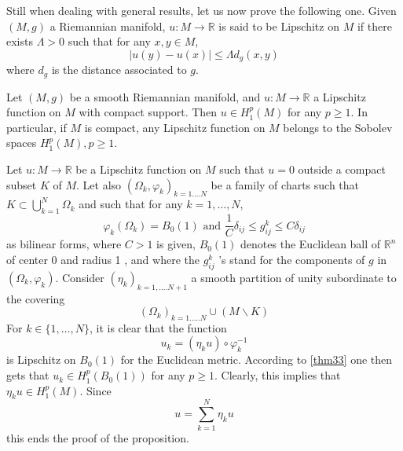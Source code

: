 \documentclass[12pt,hyperref,a4paper,UTF8]{ctexart}
\begin{document}
Still when dealing with general results, let us now prove the following one. Given $(M, g)$ a Riemannian manifold, $u: M \rightarrow \mathbb{R}$ is said to be Lipschitz on $M$ if there exists $\Lambda>0$ such that for any $x, y \in M$,
$$
|u(y)-u(x)| \leq \Lambda d_g(x, y)
$$
where $d_g$ is the distance associated to $g$.

\begin{Proposition}
    Let $(M, g)$ be a smooth Riemannian manifold, and $u: M \rightarrow \mathbb{R}$ a Lipschitz function on $M$ with compact support. Then $u \in H_1^p(M)$ for any $p \geq 1$. In particular, if $M$ is compact, any Lipschitz function on $M$ belongs to the Sobolev spaces $H_1^p(M), p \geq 1$.
\label{prp34}
\end{Proposition}

\begin{Proof}
    Let $u: M \rightarrow \mathbb{R}$ be a Lipschitz function on $M$ such that $u=0$ outside a compact subset $K$ of $M$. Let also $\left(\Omega_k, \varphi_k\right)_{k=1 \ldots . N}$ be a family of charts such that $K \subset \bigcup_{k=1}^N \Omega_k$ and such that for any $k=1, \ldots, N$,
$$
\varphi_k\left(\Omega_k\right)=B_0(1) \text { and } \frac{1}{C} \delta_{i j} \leq g_{i j}^k \leq C \delta_{i j}
$$
as bilinear forms, where $C>1$ is given, $B_0(1)$ denotes the Euclidean ball of $\mathbb{R}^n$ of center 0 and radius 1 , and where the $g_{i j}^k$ 's stand for the components of $g$ in $\left(\Omega_k, \varphi_k\right)$. Consider $\left(\eta_k\right)_{k=1, \ldots . N+1}$ a smooth partition of unity subordinate to the covering
$$
\left(\Omega_k\right)_{k=1 \ldots . . N} \cup(M \backslash K)
$$
For $k \in\{1, \ldots, N\}$, it is clear that the function
$$
u_k=\left(\eta_k u\right) \circ \varphi_k^{-1}
$$
is Lipschitz on $B_0(1)$ for the Euclidean metric. According to \autoref{thm33} one then gets that $u_k \in H_1^p\left(B_0(1)\right)$ for any $p \geq 1$. Clearly, this implies that $\eta_k u \in H_1^p(M)$. Since
$$
u=\sum_{k=1}^N \eta_k u
$$
this ends the proof of the proposition.
\end{Proof}
\end{document}
